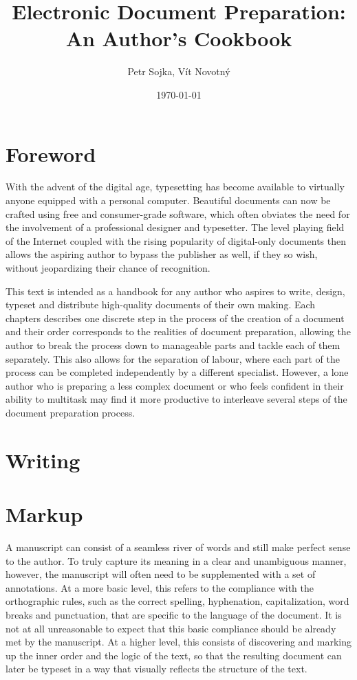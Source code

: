 \documentclass{book}
\title{Electronic Document Preparation: An Author's Cookbook}
\author{Petr Sojka, Vít Novotný}
\date{\today}
\begin{document}
  \frontmatter
    \maketitle
    \tableofcontents
  \mainmatter
    \chapter{Foreword}
      With the advent of the digital age, typesetting has become available to
      virtually anyone equipped with a personal computer. Beautiful documents
      can now be crafted using free and consumer-grade software, which often
      obviates the need for the involvement of a professional designer and
      typesetter. The level playing field of the Internet coupled with the
      rising popularity of digital-only documents then allows the aspiring
      author to bypass the publisher as well, if they so wish, without
      jeopardizing their chance of recognition.
      
      This text is intended as a handbook for any author who aspires to write,
      design, typeset and distribute high-quality documents of their own making.
      Each chapters describes one discrete step in the process of the creation
      of a document and their order corresponds to the realities of document
      preparation, allowing the author to break the process down to manageable
      parts and tackle each of them separately. This also allows for the
      separation of labour, where each part of the process can be completed
      independently by a different specialist. However, a lone author who is
      preparing a less complex document or who feels confident in their ability
      to multitask may find it more productive to interleave several steps of
      the document preparation process.

    \chapter{Writing}

    \chapter{Markup}
      A manuscript can consist of a seamless river of words and still make
      perfect sense to the author. To truly capture its meaning in a clear and
      unambiguous manner, however, the manuscript will often need to be
      supplemented with a set of annotations. At a more basic level, this refers
      to the compliance with the orthographic rules, such as the correct
      spelling, hyphenation, capitalization, word breaks and punctuation, that
      are specific to the language of the document. It is not at all
      unreasonable to expect that this basic compliance should be already met by
      the manuscript.  At a higher level, this consists of discovering and
      marking up the inner order and the logic of the text, so that the
      resulting document can later be typeset in a way that visually reflects
      the structure of the text.
      
\end{document}

